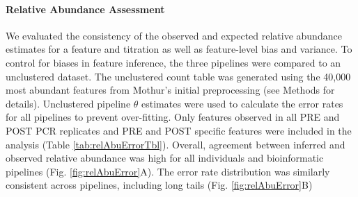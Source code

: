\documentclass[linenumbers]{bmcart}
\begin{document}
\begin{table}
\caption{\label{tab:relAbuErrorTbl}Maximum feature-level error rate bias (median error rate) and variance (robust COV) by pipeline and individual.}
\centering
{}
\end{table}

\paragraph{Relative Abundance Assessment}
We evaluated the consistency of
the observed and expected relative abundance estimates for a feature and
titration as well as feature-level bias and variance. To control
for biases in feature inference, the three pipelines were compared to an
unclustered dataset. The unclustered count table was generated using the
40,000 most abundant features from Mothur's initial preprocessing (see
Methods for details). Unclustered pipeline \(\theta\) estimates were
used to calculate the error rates for all pipelines to prevent
over-fitting. Only features observed in all PRE and POST PCR replicates
and PRE and POST specific features were included in the analysis (Table
\ref{tab:relAbuErrorTbl}). Overall, agreement between inferred
and observed relative abundance was high for all individuals and
bioinformatic pipelines (Fig. \ref{fig:relAbuError}A). The error rate
distribution was similarly consistent across pipelines, including long
tails (Fig. \ref{fig:relAbuError}B)
\end{document}
